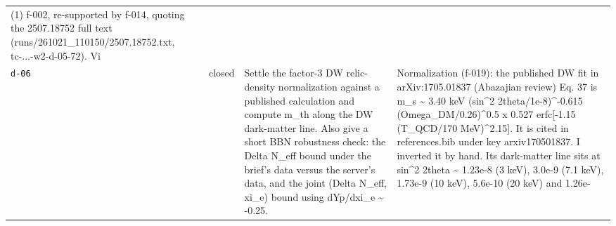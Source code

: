 \documentclass[11pt,a4paper]{article}
\begin{document}
\begin{longtable}{@{}p{}p{}p{}p{}@{}}
(1) f-002, re-supported by f-014, quoting the 2507.18752 full text (runs/261021\_110150/2507.18752.txt, tc-...-w2-d-05-72). Vi \\
\texttt{d-06} & closed & Settle the factor-3 DW relic-density normalization against a published calculation and compute m\_th along the DW dark-matter line. Also give a short BBN robustness check: the Delta N\_eff bound under the brief's data versus the server's data, and the joint (Delta N\_eff, xi\_e) bound using dYp/dxi\_e \textasciitilde{} -0.25. & Normalization (f-019): the published DW fit in arXiv:1705.01837 (Abazajian review) Eq. 37 is m\_s \textasciitilde{} 3.40 keV (sin\textasciicircum{}2 2theta/1e-8)\textasciicircum{}-0.615 (Omega\_DM/0.26)\textasciicircum{}0.5 x 0.527 erfc[-1.15 (T\_QCD/170 MeV)\textasciicircum{}2.15]. It is cited in references.bib under key arxiv170501837. I inverted it by hand. Its dark-matter line sits at sin\textasciicircum{}2 2theta \textasciitilde{} 1.23e-8 (3 keV), 3.0e-9 (7.1 keV), 1.73e-9 (10 keV), 5.6e-10 (20 keV) and 1.26e- \\
\bottomrule\end{longtable}
\end{document}
